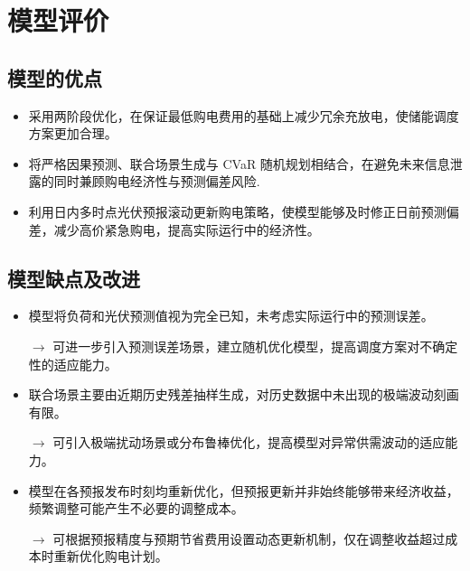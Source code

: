 \section{模型评价}
\subsection{模型的优点}
\begin{itemize}[label=$\checkmark$]
    \item 采用两阶段优化，在保证最低购电费用的基础上减少冗余充放电，使储能调度方案更加合理。    
    
    \item 将严格因果预测、联合场景生成与 CVaR 随机规划相结合，在避免未来信息泄露的同时兼顾购电经济性与预测偏差风险.
    
    \item 利用日内多时点光伏预报滚动更新购电策略，使模型能够及时修正日前预测偏差，减少高价紧急购电，提高实际运行中的经济性。
\end{itemize}

\subsection{模型缺点及改进}

\begin{itemize}[label=\textbullet]
    \item 模型将负荷和光伏预测值视为完全已知，未考虑实际运行中的预测误差。
    
    \hspace{1em}$\rightarrow$ 可进一步引入预测误差场景，建立随机优化模型，提高调度方案对不确定性的适应能力。

    \item 联合场景主要由近期历史残差抽样生成，对历史数据中未出现的极端波动刻画有限。
    
    \hspace{1em}$\rightarrow$ 可引入极端扰动场景或分布鲁棒优化，提高模型对异常供需波动的适应能力。

    \item 模型在各预报发布时刻均重新优化，但预报更新并非始终能够带来经济收益，频繁调整可能产生不必要的调整成本。
    
    \hspace{1em}$\rightarrow$ 可根据预报精度与预期节省费用设置动态更新机制，仅在调整收益超过成本时重新优化购电计划。
  \end{itemize}